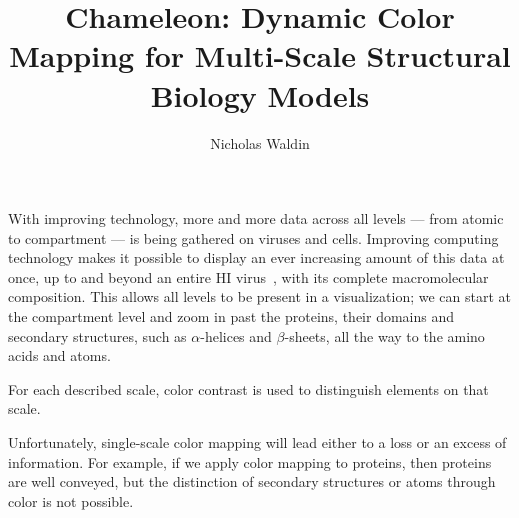 \documentclass[review,journal]{vgtc}         %
\title{Chameleon: Dynamic Color Mapping	for Multi-Scale Structural Biology Models}
\author{Nicholas Waldin}
\begin{document}

\maketitle

With improving technology, more and more data across all levels --- from atomic to compartment --- is being gathered on viruses and cells. 
Improving computing technology makes it possible to display an ever increasing amount of this data at once, up to and beyond an entire HI virus~\cite{muzic2015cellview}, with its complete macromolecular composition.
This allows all levels to be present in a visualization; we can start at the compartment level and zoom in past the proteins, their domains and secondary structures, such as $\alpha$-helices and $\beta$-sheets, all the way to the amino acids and atoms.

For each described scale, color contrast is used to distinguish elements on that scale.

Unfortunately, single-scale color mapping will lead either to a loss or an excess of information.
For example, if we apply color mapping to proteins, then proteins are well conveyed, but the distinction of secondary structures or atoms through color is not possible.
\end{document}
